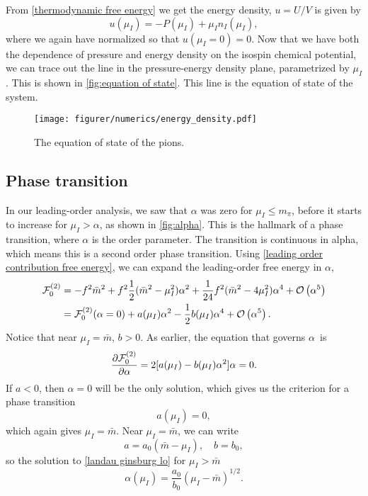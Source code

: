 From \cref{thermodynamic free energy} we get the energy density, $u = U/V$ is given by
\begin{equation}
    u(\mu_I) = -P(\mu_I) + \mu_I n_I(\mu_I),
\end{equation}
where we again have normalized so that $u(\mu_I = 0) = 0$.
Now that we have both the dependence of pressure and energy density on the isospin chemical potential, we can trace out the line in the pressure-energy density plane, parametrized by $\mu_I$.
This is shown in \autoref{fig:equation of state}.
This line is the equation of state of the system.

\begin{figure}[!h]
    \centering
    \vspace{-0.2cm}
    \texttt{[image: figurer/numerics/energy\_density.pdf]}
    \caption{The equation of state of the pions.}
    \label{fig:equation of state}
\end{figure}

\FloatBarrier

\subsection*{Phase transition}
In our leading-order analysis, we saw that $\alpha$ was zero for $\mu_I \leq m_\pi$, before it starts to increase for $\mu_I>\alpha$, as shown in \autoref{fig:alpha}.
This is the hallmark of a phase transition, where $\alpha$ is the order parameter.
The transition is continuous in alpha, which means this is a second order phase transition.
Using \cref{leading order contribution free energy}, we can expand the leading-order free energy in $\alpha$,
\begin{align}
    \Ef_0^{(2)} 
    & = -f^2 \bar m^2 + f^2 \frac{1}{2}(\bar m^2 - \mu_I^2)\alpha^2
    +\frac{1}{24} f^2 (\bar m^2 - 4 \mu_I^2) \alpha^4 + \Oh[5]{\alpha} \\
    & = \Ef_0^{(2)}(\alpha=0) + a(\mu_I)\alpha^2 - \frac{1}{2} b(\mu_I)\alpha^4 + \Oh[5]{\alpha}.
\end{align}
Notice that near $\mu_I = \bar m$, $b > 0$.
As earlier, the equation that governs $\alpha$ is
\begin{equation}
    \label{landau ginsburg lo}
    \diffp{\Ef_0^{(2)}}{\alpha} = 2 [a(\mu_I) - b(\mu_I) \alpha^2] \alpha = 0.
\end{equation}
If $a<0$, then $\alpha = 0$ will be the only solution, which gives us the criterion for a phase transition 
\begin{equation}
    a(\mu_I) = 0,
\end{equation}
which again gives $\mu_I = \bar m$.
Near $\mu_I = \bar m$, we can write
\begin{equation}
    a = a_0 (\bar m - \mu_I), \quad b = b_0,
\end{equation}
so the solution to \cref{landau ginsburg lo} for $\mu_I>\bar m$
\begin{equation}
    \alpha(\mu_I) = \frac{a_0}{b_0} (\mu_I - \bar m)^{1/2}.
\end{equation}

